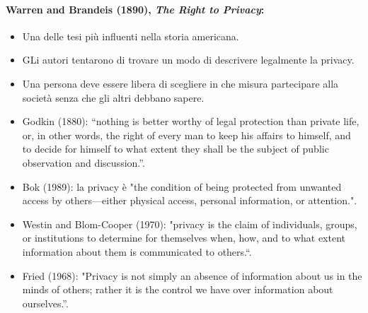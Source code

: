 
\paragraph{Warren and Brandeis (1890), \textit{The Right to Privacy}:}

\begin{itemize}
  \item Una delle tesi più influenti nella storia americana. 
  \item GLi autori tentarono di trovare un modo di descrivere legalmente la privacy.
\end{itemize}



\begin{itemize}
  \item Una persona deve essere libera di scegliere in che misura partecipare alla società senza che gli altri debbano sapere. 
  \item Godkin (1880): “nothing is better worthy of legal protection than
private life, or, in other words, the right of every man to keep his
affairs to himself, and to decide for himself to what extent they
shall be the subject of public observation and discussion.”. 
\item Bok (1989): la privacy è "the condition of being protected from
unwanted access by others—either physical access, personal
information, or attention.".
\end{itemize}


\begin{itemize}
  \item Westin and Blom-Cooper (1970): "privacy is the claim of
individuals, groups, or institutions to determine for
themselves when, how, and to what extent information
about them is communicated to others.“. 
\item Fried (1968): "Privacy is not simply an absence of
information about us in the minds of others; rather it is the
control we have over information about ourselves.”.
\end{itemize}

